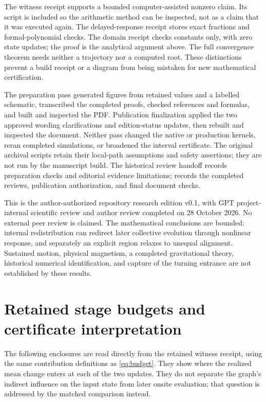 \documentclass[11pt,a4paper]{article}
\numberwithin{equation}{section}
\theoremstyle{remark}\newtheorem{remark}[theorem]{Remark}
\begin{document}
The witness receipt supports a bounded computer-assisted nonzero claim. Its script is included so the arithmetic method can be inspected, not as a claim that it was executed again. The delayed-response receipt stores exact fractions and formal-polynomial checks. The domain receipt checks constants only, with zero state updates; the proof is the analytical argument above. The full convergence theorem needs neither a trajectory nor a computed root. These distinctions prevent a build receipt or a diagram from being mistaken for new mathematical certification.

The preparation pass generated figures from retained values and a labelled schematic, transcribed the completed proofs, checked references and formulas, and built and inspected the PDF. Publication finalization applied the two approved wording clarifications and edition-status updates, then rebuilt and inspected the document. Neither pass changed the native or production kernels, reran completed simulations, or broadened the interval certificate. The original archival scripts retain their local-path assumptions and safety assertions; they are not run by the manuscript build. The historical review handoff records preparation checks and editorial evidence limitations;  records the completed reviews, publication authorization, and final document checks.

This is the author-authorized repository research edition v0.1, with GPT project-internal scientific review and author review completed on 28 October 2026. No external peer review is claimed. The mathematical conclusions are bounded: internal redistribution can redirect later collective evolution through nonlinear response, and separately an explicit region relaxes to unequal alignment. Sustained motion, physical magnetism, a completed gravitational theory, historical numerical identification, and capture of the turning entrance are not established by these results.

\appendix
\section{Retained stage budgets and certificate interpretation}\label{app:budgets}

The following enclosures are read directly from the retained witness receipt, using the same contribution definitions as \eqref{eq:budget}. They show where the realized mean change enters at each of the two updates. They do not separate the graph's indirect influence on the input state from later onsite evaluation; that question is addressed by the matched comparison instead.
\begin{table}[htbp]\centering\footnotesize
\caption{Onsite and synchronization contributions in the full-map witness.}

\end{table}
\end{document}
